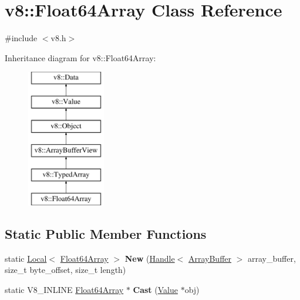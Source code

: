 \hypertarget{classv8_1_1Float64Array}{\section{v8\-:\-:Float64\-Array Class Reference}
\label{classv8_1_1Float64Array}
}


{\ttfamily \#include $<$v8.\-h$>$}

Inheritance diagram for v8\-:\-:Float64\-Array\-:\begin{figure}[H]
\begin{center}
\leavevmode
\includegraphics[height=6.000000cm]{classv8_1_1Float64Array}
\end{center}
\end{figure}
\subsection*{Static Public Member Functions}
\begin{DoxyCompactItemize}
\item 
\hypertarget{classv8_1_1Float64Array_ae09a38a945fb88065956e1d87132f0b4}{static \hyperlink{classv8_1_1Local}{Local}$<$ \hyperlink{classv8_1_1Float64Array}{Float64\-Array} $>$ {\bfseries New} (\hyperlink{classv8_1_1Handle}{Handle}$<$ \hyperlink{classv8_1_1ArrayBuffer}{Array\-Buffer} $>$ array\-\_\-buffer, size\-\_\-t byte\-\_\-offset, size\-\_\-t length)}\label{classv8_1_1Float64Array_ae09a38a945fb88065956e1d87132f0b4}

\item 
\hypertarget{classv8_1_1Float64Array_a936ee8e8cb2cb892cc5369e3ee6a7784}{static V8\-\_\-\-I\-N\-L\-I\-N\-E \hyperlink{classv8_1_1Float64Array}{Float64\-Array} $\ast$ {\bfseries Cast} (\hyperlink{classv8_1_1Value}{Value} $\ast$obj)}\label{classv8_1_1Float64Array_a936ee8e8cb2cb892cc5369e3ee6a7784}

\end{DoxyCompactItemize}
